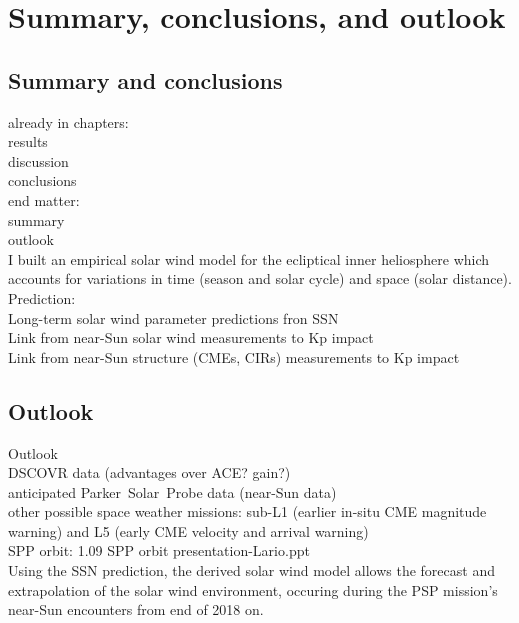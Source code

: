 
\chapter{Summary, conclusions, and outlook}
\label{chap:summary}


\section{Summary and conclusions}

already in chapters:\\
results\\
discussion\\
conclusions\\

end matter:\\
summary\\
outlook\\



I built an empirical solar wind model for the ecliptical inner heliosphere which accounts for variations in time (season and solar cycle) and space (solar distance).\\

Prediction:\\
Long-term solar wind parameter predictions fron SSN\\
Link from near-Sun solar wind measurements to Kp impact\\
Link from near-Sun structure (CMEs, CIRs) measurements to Kp impact\\


\section{Outlook}


Outlook\\
DSCOVR data (advantages over ACE? gain?)\\
anticipated Parker~Solar~Probe data (near-Sun data)\\

other possible space weather missions: sub-L1 (earlier in-situ CME magnitude warning) and L5 (early CME velocity and arrival warning)\\

SPP orbit:	1.09 SPP orbit presentation-Lario.ppt\\

Using the SSN prediction, the derived solar wind model allows the forecast and extrapolation of the solar wind environment, occuring during the PSP mission's near-Sun encounters from end of 2018 on.\\




